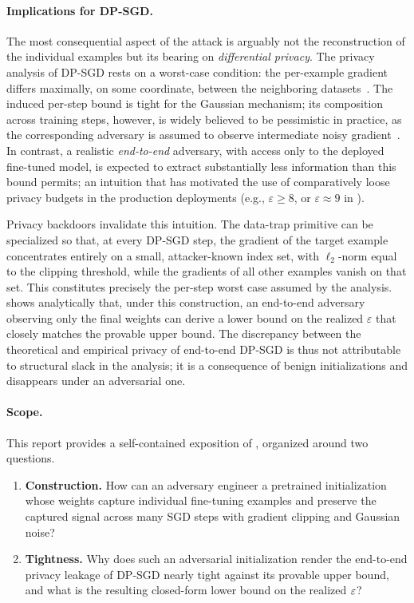 \paragraph{Implications for DP-SGD.} The most consequential aspect of the attack is arguably not the reconstruction of the individual examples but its bearing on \emph{differential privacy}. The privacy analysis of DP-SGD rests on a worst-case condition: the per-example gradient differs maximally, on some coordinate, between the neighboring datasets~\citep{abadi2016deep}. The induced per-step bound is tight for the Gaussian mechanism; its composition across training steps, however, is widely believed to be pessimistic in practice, as the corresponding adversary is assumed to observe intermediate noisy gradient~\citep{nasr2021adversary}. In contrast, a realistic \emph{end-to-end} adversary, with access only to the deployed fine-tuned model, is expected to extract substantially less information than this bound permits; an intuition that has motivated the use of comparatively loose privacy budgets in the production deployments (e.g., $\varepsilon \geq 8$, or $\varepsilon \approx 9$ in \citet{ramaswamy2020training}).

Privacy backdoors invalidate this intuition. The data-trap primitive can be specialized so that, at every DP-SGD step, the gradient of the target example concentrates entirely on a small, attacker-known index set, with $\ell_2$-norm equal to the clipping threshold, while the gradients of all other examples vanish on that set. This constitutes precisely the per-step worst case assumed by the analysis. \citet{feng2024privacy} shows analytically that, under this construction, an end-to-end adversary observing only the final weights can derive a lower bound on the realized $\varepsilon$ that closely matches the provable upper bound. The discrepancy between the theoretical and empirical privacy of end-to-end DP-SGD is thus not attributable to structural slack in the analysis; it is a consequence of  benign initializations and disappears under an adversarial one.

\paragraph{Scope.} This report provides a self-contained exposition of \citet{feng2024privacy}, organized around two questions.
\begin{enumerate}[label=(\roman*), leftmargin=*, itemsep=2pt, topsep=2pt]
  \item \textbf{Construction.} How can an adversary engineer a pretrained initialization whose weights capture individual fine-tuning examples and preserve the captured signal across many SGD steps with gradient clipping and Gaussian noise?
  \item \textbf{Tightness.} Why does such an adversarial initialization render the end-to-end privacy leakage of DP-SGD nearly tight against its provable upper bound, and what is the resulting closed-form lower bound on the realized $\varepsilon$?
\end{enumerate}

